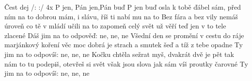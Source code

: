 \begin{TEXT}{Čest dej}
\REFREN /:  :/                      4x \NL
  P jen, Pán jen,Pán buď  \NL             %
P jen  buď osla 
\SLOKA {} k tobě ďábel sám,  před ním  \NL
na to dobrou  mám,   \NL
{} i slávu,  říš  ti nabí \NL
{} mu na to     
\SLOKA Bez fára a bez vily nemáš úroveň \NL
co tě v mládí učili na to zapomeň \NL
celý svět už věří teď jen v to tele zlacené \NL
Dáš jim na to odpověď: ne, ne, ne 
\SLOKA Všední den se promění v cestu do ráje \NL
marjánkový koření věc moc dobrá je \NL
strach a smutek šeď a tíž z tebe opadne \NL
Ty jim na to odpovíš: ne, ne, ne 
\SLOKA Kočku chtěla sežrat myš, dvakrát dvě je pět \NL
tak nám to tu podepiš, otevřeš si svět \NL
však jsou slova jak sám víš proutky čarovné \NL
Ty jim na to odpovíš: ne, ne, ne \NL
\end{TEXT}
